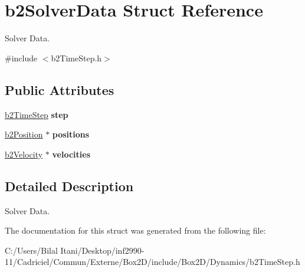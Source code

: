 \hypertarget{structb2_solver_data}{}\section{b2\+Solver\+Data Struct Reference}
\label{structb2_solver_data}


Solver Data.  




{\ttfamily \#include $<$b2\+Time\+Step.\+h$>$}

\subsection*{Public Attributes}
\begin{DoxyCompactItemize}
\item 
\hyperlink{structb2_time_step}{b2\+Time\+Step} {\bfseries step}\hypertarget{structb2_solver_data_a99998296de1b4f128c396def56392eea}{}\label{structb2_solver_data_a99998296de1b4f128c396def56392eea}

\item 
\hyperlink{structb2_position}{b2\+Position} $\ast$ {\bfseries positions}\hypertarget{structb2_solver_data_a5eb6ee68b42d96164579a4a0df8be04b}{}\label{structb2_solver_data_a5eb6ee68b42d96164579a4a0df8be04b}

\item 
\hyperlink{structb2_velocity}{b2\+Velocity} $\ast$ {\bfseries velocities}\hypertarget{structb2_solver_data_a1072627a3e962a8bc7088657a512191c}{}\label{structb2_solver_data_a1072627a3e962a8bc7088657a512191c}

\end{DoxyCompactItemize}


\subsection{Detailed Description}
Solver Data. 

The documentation for this struct was generated from the following file\+:\begin{DoxyCompactItemize}
\item 
C\+:/\+Users/\+Bilal Itani/\+Desktop/inf2990-\/11/\+Cadriciel/\+Commun/\+Externe/\+Box2\+D/include/\+Box2\+D/\+Dynamics/b2\+Time\+Step.\+h\end{DoxyCompactItemize}
